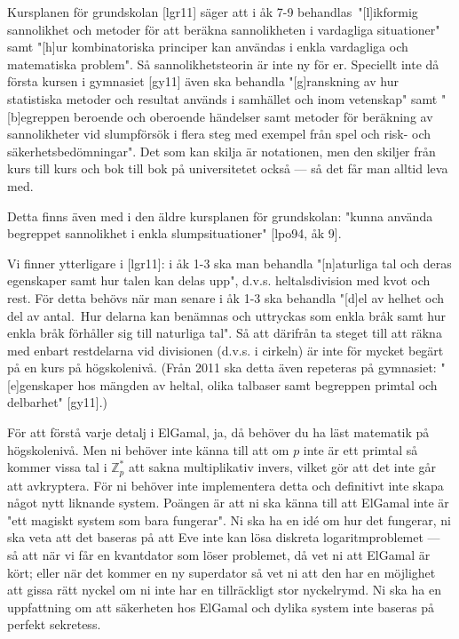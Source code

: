 Kursplanen för grundskolan [lgr11] säger att i åk 7-9 behandlas "[l]ikformig 
sannolikhet och metoder för att beräkna sannolikheten i vardagliga situationer" 
samt "[h]ur kombinatoriska principer kan användas i enkla vardagliga och 
matematiska problem". Så sannolikhetsteorin är inte ny för er. Speciellt inte 
då första kursen i gymnasiet [gy11] även ska behandla "[g]ranskning av hur 
statistiska metoder och resultat används i samhället och inom vetenskap" samt 
"[b]egreppen beroende och oberoende händelser samt metoder för beräkning av 
sannolikheter vid slumpförsök i flera steg med exempel från spel och risk- och 
säkerhetsbedömningar". Det som kan skilja är notationen, men den skiljer från 
kurs till kurs och bok till bok på universitetet också --- så det får man 
alltid leva med.

Detta finns även med i den äldre kursplanen för grundskolan: "kunna 
använda begreppet sannolikhet i enkla slumpsituationer" [lpo94, åk 9].

Vi finner ytterligare i [lgr11]: i åk 1-3 ska man behandla "[n]aturliga 
tal och deras egenskaper samt hur talen kan delas upp", d.v.s.  
heltalsdivision med kvot och rest. För detta behövs när man senare i åk 
1-3 ska behandla "[d]el av helhet och del av antal. Hur delarna kan 
benämnas och uttryckas som enkla bråk samt hur enkla bråk förhåller sig 
till naturliga tal". Så att därifrån ta steget till att räkna med enbart 
restdelarna vid divisionen (d.v.s. i cirkeln) är inte för mycket begärt 
på en kurs på högskolenivå. (Från 2011 ska detta även repeteras på 
gymnasiet: "[e]genskaper hos mängden av heltal, olika talbaser samt 
begreppen primtal och delbarhet" [gy11].)

För att förstå varje detalj i ElGamal, ja, då behöver du ha läst 
matematik på högskolenivå. Men ni behöver inte känna till att om $p$ 
inte är ett primtal så kommer vissa tal i $\mathbb{Z}_p^*$ att sakna 
multiplikativ invers, vilket gör att det inte går att avkryptera. För ni 
behöver inte implementera detta och definitivt inte skapa något nytt liknande 
system.  Poängen är att ni ska känna till att ElGamal inte är "ett magiskt 
system som bara fungerar".  Ni ska ha en idé om hur det fungerar, ni ska veta 
att det baseras på att Eve inte kan lösa diskreta logaritmproblemet --- så att 
när vi får en kvantdator som löser problemet, då vet ni att ElGamal är kört; 
eller när det kommer en ny superdator så vet ni att den har en möjlighet att 
gissa rätt nyckel om ni inte har en tillräckligt stor nyckelrymd.  Ni ska ha en 
uppfattning om att säkerheten hos ElGamal och dylika system inte baseras på 
perfekt sekretess.

